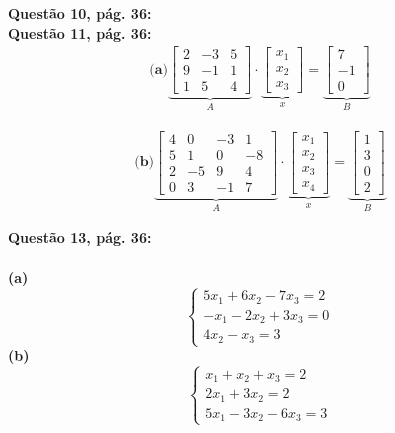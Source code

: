 \documentclass[a4paper,12pt]{article}
\begin{document}
\textbf{Questão 10, pág. 36:}\\

\textbf{Questão 11, pág. 36:}
\begin{align*}
    \textbf{(a)}
    \underbrace{
    \begin{bmatrix}
        2 & -3 & 5\\
        9 & -1 & 1\\
        1 & 5 & 4
    \end{bmatrix}}_{A} 
    \cdot
    \underbrace{
    \begin{bmatrix}
        x_{1} \\
        x_{2} \\
        x_{3}
    \end{bmatrix}}_{x}
    =
    \underbrace{
    \begin{bmatrix}
        7 \\
        -1 \\
        0
    \end{bmatrix}}_{B}
\end{align*}

\begin{align*}
    \textbf{(b)}
    \underbrace{
    \begin{bmatrix}
        4 & 0 & -3 & 1\\
        5 & 1 & 0 & -8\\
        2 & -5 & 9 & 4\\
        0 & 3 & -1 & 7
    \end{bmatrix}}_{A} 
    \cdot
    \underbrace{
    \begin{bmatrix}
        x_{1} \\
        x_{2} \\
        x_{3} \\
        x_{4}
    \end{bmatrix}}_{x}
    =
    \underbrace{
    \begin{bmatrix}
        1 \\
        3 \\
        0 \\
        2
    \end{bmatrix}}_{B}
\end{align*}

\textbf{Questão 13, pág. 36:}\\ \\
\textbf{(a)}
\begin{equation*}
    \begin{cases*}
        5x_1 + 6x_2 - 7x_3 = 2 \\
        -x_1 - 2x_2 + 3x_3 = 0 \\
               4x_2 - x_ 3 = 3
    \end{cases*}
\end{equation*}
\textbf{(b)}
\begin{equation*}
    \begin{cases*}
         x_1 +  x_2 +  x_3 = 2 \\
        2x_1 + 3x_2        = 2 \\
        5x_1 - 3x_2 - 6x_3 = 3
    \end{cases*}
\end{equation*}
\end{document}
